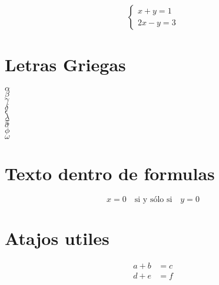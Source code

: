 \documentclass{article} %
\begin{document}
\[
\begin{cases}
x + y = 1 \\
2x - y = 3
\end{cases}
\]

\section{Letras Griegas}
$\alpha$\\
$\beta$\\
$\gamma$\\
$\delta$\\
$\epsilon$\\
$\lambda$\\
$\pi$\\
$\sigma$\\
$\phi$\\
$\omega$\\

\section{Texto dentro de formulas}
\[
x = 0 \quad \text{si y sólo si} \quad y = 0
\]

\section{Atajos utiles}
\begin{align*}
a + b &= c \\
d + e &= f
\end{align*}
\end{document}
